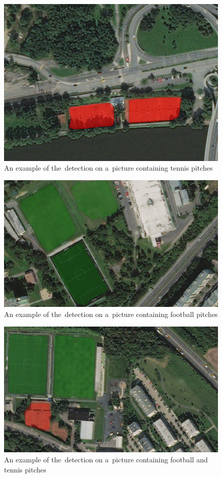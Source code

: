 \begin{figure}[H]
   \centering
	\includegraphics[width=.9\linewidth]{./pictures/out2.png}
	\caption[Detection of tennis pitches]{An example of the~detection on
	a~picture containing tennis pitches}
      \label{fig:tennis1}
\end{figure}

\begin{figure}[H]
   \centering
	\includegraphics[width=.9\linewidth]{./pictures/out4.png}
	\caption[Detection of football pitches, another resolution]{An example of
	the~detection on a~picture containing football pitches}
      \label{fig:football2}
\end{figure}

\begin{figure}[H]
   \centering
	\includegraphics[width=.9\linewidth]{./pictures/out3.png}
	\caption[Detection of football and tennis pitches]{An example of the~detection
	on a~picture containing football and tennis pitches}
      \label{fig:football-tennis}
\end{figure}

